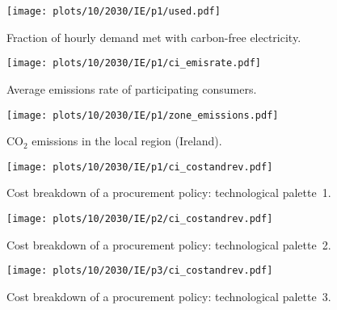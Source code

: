 \documentclass[11pt, 5p, nopreprintline]{elsarticle}
\begin{document}
\begin{figure*}
    \centering
    \begin{subfigure}{0.5\textwidth}
        \centering
        \caption{Fraction of hourly demand met with carbon-free electricity.}
        \texttt{[image: plots/10/2030/IE/p1/used.pdf]}
        \label{fig:10-2030-IE-p1-used}
    \end{subfigure}%
    \begin{subfigure}{0.5\textwidth}
        \centering
        \caption{Average emissions rate of participating consumers.}
        \texttt{[image: plots/10/2030/IE/p1/ci\_emisrate.pdf]}
        \label{fig:10-2030-IE-p1-ci_emisrate}
    \end{subfigure}

    \begin{subfigure}{0.5\textwidth}
        \centering
        \caption{CO$_2$ emissions in the local region (Ireland).}
        \texttt{[image: plots/10/2030/IE/p1/zone\_emissions.pdf]}
        \label{fig:10-2030-IE-p1-zone_emissions}
    \end{subfigure}%
    \begin{subfigure}{0.5\textwidth}
        \caption{Cost breakdown of a procurement policy: technological palette~1.}
        \texttt{[image: plots/10/2030/IE/p1/ci\_costandrev.pdf]}
        \label{fig:10-2030-IE-p1-ci_costandrev}
    \end{subfigure}%

    \begin{subfigure}{0.5\textwidth}
        \centering
        \caption{Cost breakdown of a procurement policy: technological palette~2.}
        \texttt{[image: plots/10/2030/IE/p2/ci\_costandrev.pdf]}
        \label{fig:10-2030-IE-p2-ci_costandrev}
    \end{subfigure}%
    \begin{subfigure}{0.5\textwidth}
        \centering
        \caption{Cost breakdown of a procurement policy: technological palette~3.}
        \texttt{[image: plots/10/2030/IE/p3/ci\_costandrev.pdf]}
        \label{fig:10-2030-IE-p3-ci_costandrev}
    \end{subfigure}

    \caption{Results for the scenario of Ireland 2030; 10\% participation rate.
    Figures \ref{fig:10-2030-IE-p1-used}--\ref{fig:10-2030-IE-p1-ci_costandrev} display the technological palette~1 scenario.}
    \label{fig:10-2030-IE-6plots}
\end{figure*}
\end{document}
